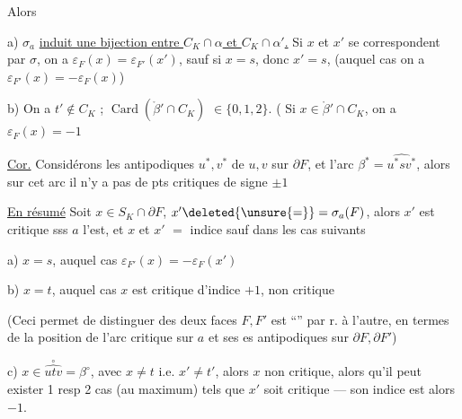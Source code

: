 Alors

a)  $\sigma_a$ \uline{induit une bijection entre $C_K\cap\alpha$ et $C_K\cap\alpha'$.}  Si $x$ et $x'$ se correspondent par $\sigma$, on a $\varepsilon_F(x)=\varepsilon_{F'}(x')$, sauf si $x=s$, donc $x'=s$, (auquel cas on a $\varepsilon_{F'}(x)=-\varepsilon_F(x)$)

b) On a $t'\notin C_K$ ;   $\operatorname{Card}(\mathring{\beta}'\cap C_K)$  $\in\{0,1,2\}$. (   Si $x\in\mathring{\beta}'\cap C_K$, on a $\varepsilon_F(x)=-1$

\uline{Cor.} Considérons les antipodiques $u^*,v^*$ de $u,v$ sur $\partial F$, et l'arc $\beta^*=\widehat{u^*sv^*}$,  alors sur cet arc il n'y a pas de pts critiques de signe $\pm1$

\uline{En résumé} \quad Soit $x\in S_K\cap\partial F$,  $x'\deleted{\unsure{=}}=\sigma_a(F)$, alors $x'$ est critique sss $a$ l'est, et $x$ et $x'$  $=$ indice sauf dans les cas suivants

a) $x=s$, auquel cas $\varepsilon_{F'}(x)=-\varepsilon_F(x')$

b) $x=t$, auquel cas  $x$ est critique d'indice $+1$,  non critique

(Ceci permet de distinguer   des deux faces $F,F'$ est ``'' par r. à l'autre, en termes de la position de l'arc critique  sur $a$ et ses es antipodiques sur $\partial F,\partial F'$)

c) $x\in\overset{\circ}{\widehat{utv}}=\beta^\circ$, avec $x\ne t$ i.e. $x'\ne t'$, alors $x$ non critique, alors qu'il peut exister 1 resp 2 cas (au maximum) tels que $x'$ soit critique --- son indice est alors $-1$.
